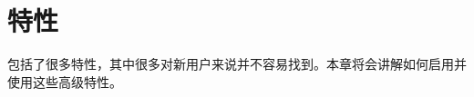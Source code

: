 
\ifchinese
\chapter{{\\}特性}
\label{特性}
\fi
\iffalse
\IfLanguageName{english}{
\chapter{Features}
\label{features}
}{}
\fi
{}
\ifchinese
\FlightGear{} 包括了很多特性，其中很多对新用户来说并不容易找到。本章将会讲解如何启用并使用这些高级特性。

